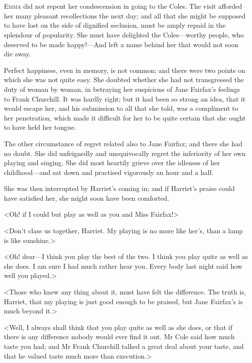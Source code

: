 \chapter[Chapter \thechapter]{}
\lettrine[lraise=0.3]{E}{mma} did not repent her condescension in going to the Coles. The visit afforded her many pleasant recollections the next day; and all that she might be supposed to have lost on the side of dignified seclusion, must be amply repaid in the splendour of popularity. She must have delighted the Coles—worthy people, who deserved to be made happy!—And left a name behind her that would not soon die away.

Perfect happiness, even in memory, is not common; and there were two points on which she was not quite easy. She doubted whether she had not transgressed the duty of woman by woman, in betraying her suspicions of Jane Fairfax's feelings to Frank Churchill. It was hardly right; but it had been so strong an idea, that it would escape her, and his submission to all that she told, was a compliment to her penetration, which made it difficult for her to be quite certain that she ought to have held her tongue.

The other circumstance of regret related also to Jane Fairfax; and there she had no doubt. She did unfeignedly and unequivocally regret the inferiority of her own playing and singing. She did most heartily grieve over the idleness of her childhood—and sat down and practised vigorously an hour and a half.

She was then interrupted by Harriet's coming in; and if Harriet's praise could have satisfied her, she might soon have been comforted.

<Oh! if I could but play as well as you and Miss Fairfax!>

<Don't class us together, Harriet. My playing is no more like her's, than a lamp is like sunshine.>

<Oh! dear—I think you play the best of the two. I think you play quite as well as she does. I am sure I had much rather hear you. Every body last night said how well you played.>

<Those who knew any thing about it, must have felt the difference. The truth is, Harriet, that my playing is just good enough to be praised, but Jane Fairfax's is much beyond it.>

<Well, I always shall think that you play quite as well as she does, or that if there is any difference nobody would ever find it out. Mr Cole said how much taste you had; and Mr Frank Churchill talked a great deal about your taste, and that he valued taste much more than execution.>

